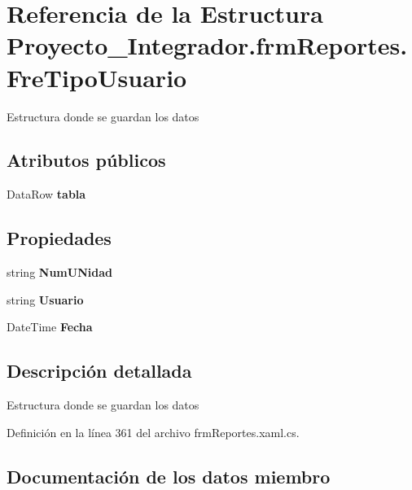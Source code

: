 \section{Referencia de la Estructura Proyecto\-\_\-\-Integrador.\-frm\-Reportes.\-Fre\-Tipo\-Usuario}
\label{struct_proyecto___integrador_1_1frm_reportes_1_1_fre_tipo_usuario}


Estructura donde se guardan los datos  


\subsection*{Atributos públicos}
\begin{DoxyCompactItemize}
\item 
Data\-Row {\bf tabla}
\end{DoxyCompactItemize}
\subsection*{Propiedades}
\begin{DoxyCompactItemize}
\item 
string {\bf Num\-U\-Nidad}\hspace{0.3cm}{\ttfamily  [get]}
\item 
string {\bf Usuario}\hspace{0.3cm}{\ttfamily  [get]}
\item 
Date\-Time {\bf Fecha}\hspace{0.3cm}{\ttfamily  [get]}
\end{DoxyCompactItemize}


\subsection{Descripción detallada}
Estructura donde se guardan los datos 



Definición en la línea 361 del archivo frm\-Reportes.\-xaml.\-cs.



\subsection{Documentación de los datos miembro}

